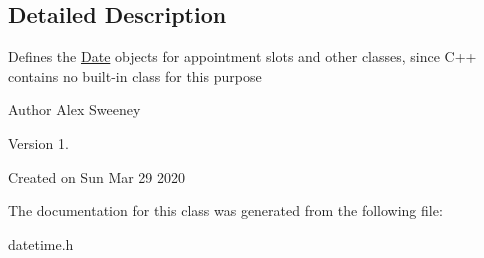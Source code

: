 \subsection{Detailed Description}
Defines the \hyperlink{structDate}{Date} objects for appointment slots and other classes, since C++ contains no built-\/in class for this purpose

\begin{DoxyAuthor}{Author}
Alex Sweeney
\end{DoxyAuthor}
\begin{DoxyVersion}{Version}
1.
\end{DoxyVersion}
Created on Sun Mar 29 2020 

The documentation for this class was generated from the following file\-:\begin{DoxyCompactItemize}
\item 
datetime.\-h\end{DoxyCompactItemize}
